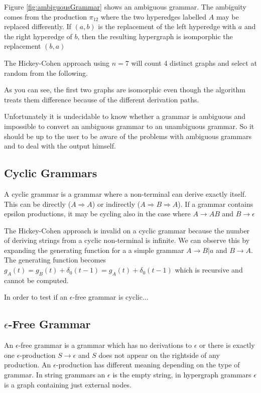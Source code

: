

Figure \ref{fig:ambiguousGrammar} shows an ambiguous grammar. The ambiguity comes from the production $\pi_{12}$ where the two hyperedges labelled $A$ may be replaced differently. If $(a,b)$ is the replacement of the left hyperedge with $a$ and the right hyperedge of $b$, then the resulting hypergraph is isomporphic the replacement $(b, a)$

The Hickey-Cohen approach using $n=7$ will count 4 distinct graphs and select at random from the following.



As you can see, the first two graphs are isomorphic even though the algorithm treats them difference because of the different derivation paths.

Unfortunately it is undecidable to know whether a grammar is ambiguous and impossible to convert an ambiguous grammar to an unambiguous grammar. So it should be up to the user to be aware of the problems with ambiguous grammars and to deal with the output himself.

\subsection{Cyclic Grammars}

A cyclic grammar is a grammar where a non-terminal can derive exactly itself. This can be directly ($A \Rightarrow A$) or indirectly ($A \Rightarrow B \Rightarrow A$). If a grammar contains epsilon productions, it may be cycling also in the case where $A \to AB$ and $B \to \epsilon$

The Hickey-Cohen approach is invalid on a cyclic grammar because the number of deriving strings from a cyclic non-terminal is infinite. We can observe this by expanding the generating function for a a simple grammar $A \to B | a$ and $B \to A$. The generating function becomes $g_A(t) = g_B(t) + \delta_0(t-1) = g_A(t) + \delta_0(t-1)$ which is recursive and cannot be computed.

In order to test if an $\epsilon$-free grammar is cyclic...

\subsection{$\epsilon$-Free Grammar}

An $\epsilon$-free grammar is a grammar which has no derivations to $\epsilon$ or there is exactly one $\epsilon$-production $S \to \epsilon$ and $S$ does not appear on the rightside of any production. An $\epsilon$-production has different meaning depending on the type of grammar. In string grammars an $\epsilon$ is the empty string, in hypergraph grammars $\epsilon$ is a graph containing just external nodes.

